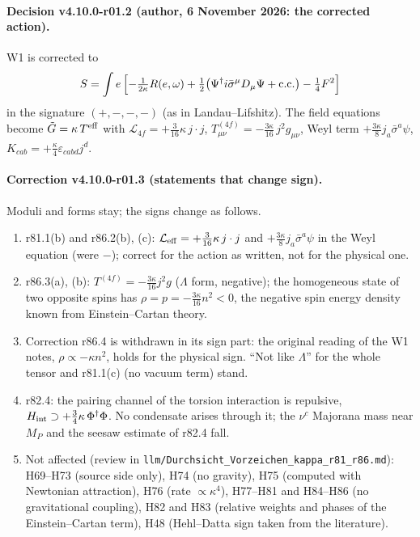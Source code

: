 \paragraph{Decision v4.10.0-r01.2 (author, 6 November 2026: the corrected action).}
W1 is corrected to
\[
S=\int e\,\Bigl[-\tfrac1{2\kappa}R(e,\omega)+\tfrac12\bigl(\Psi^\dagger i\bar\sigma^\mu D_\mu\Psi+\mathrm{c.c.}\bigr)-\tfrac14F^2\Bigr]
\]
in the signature \((+,-,-,-)\) (as in Landau--Lifshitz).  The field equations become \(\tilde G=\kappa\,T^{\rm eff}\) with
\(\mathcal L_{4f}=+\tfrac3{16}\kappa\,j\cdot j\), \(T^{(4f)}_{\mu\nu}=-\tfrac{3\kappa}{16}\,j^2g_{\mu\nu}\), Weyl term \(+\tfrac{3\kappa}{8}j_a\bar\sigma^a\psi\),
\(K_{cab}=+\tfrac\kappa4\varepsilon_{cabd}j^d\).

\paragraph{Correction v4.10.0-r01.3 (statements that change sign).}
Moduli and forms stay; the signs change as follows.
\begin{enumerate}[leftmargin=2em]
\item[(a)] r81.1(b) and r86.2(b), (c): \(\mathcal L_{\rm eff}=+\tfrac3{16}\kappa\,j\cdot j\) and \(+\tfrac{3\kappa}{8}j_a\bar\sigma^a\psi\) in the Weyl equation (were
\(-\)); correct for the action as written, not for the physical one.
\item[(b)] r86.3(a), (b): \(T^{(4f)}=-\tfrac{3\kappa}{16}j^2g\) (\(\Lambda\) form, negative); the homogeneous state of two opposite spins has
\(\rho=p=-\tfrac{3\kappa}{16}n^2<0\), the negative spin energy density known from Einstein--Cartan theory.
\item[(c)] Correction r86.4 is withdrawn in its sign part: the original reading of the W1 notes, \(\rho\propto-\kappa n^2\), holds for the physical
sign.  ``Not like \(\Lambda\)'' for the whole tensor and r81.1(c) (no vacuum term) stand.
\item[(d)] r82.4: the pairing channel of the torsion interaction is repulsive, \(H_{\rm int}\supset+\tfrac34\kappa\,\Phi^\dagger\Phi\).  No condensate arises
through it; the \(\nu^c\) Majorana mass near \(M_P\) and the seesaw estimate of r82.4 fall.
\item[(e)] Not affected (review in \texttt{llm/\allowbreak Durchsicht\_\allowbreak Vorzeichen\_\allowbreak kappa\_\allowbreak r81\_\allowbreak r86.md}): H69--H73 (source side only),
H74 (no gravity), H75 (computed with Newtonian attraction), H76 (rate \(\propto\kappa^4\)), H77--H81 and H84--H86 (no gravitational coupling), H82
and H83 (relative weights and phases of the Einstein--Cartan term), H48 (Hehl--Datta sign taken from the literature).
\end{enumerate}

